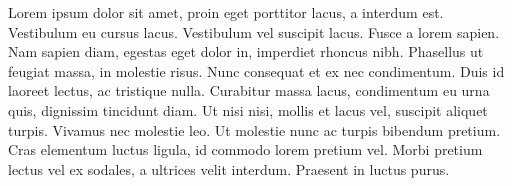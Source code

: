 \begin{page}
	
	
	\begin{Profile}[%
		image=img/ep.jpg,
	]%
		Lorem ipsum dolor sit amet, proin eget porttitor lacus, a interdum est. Vestibulum eu cursus lacus. Vestibulum vel suscipit lacus. Fusce a lorem sapien. Nam sapien diam, egestas eget dolor in, imperdiet rhoncus nibh. Phasellus ut feugiat massa, in molestie risus. Nunc consequat et ex nec condimentum. Duis id laoreet lectus, ac tristique nulla. Curabitur massa lacus, condimentum eu urna quis, dignissim tincidunt diam. Ut nisi nisi, mollis et lacus vel, suscipit aliquet turpis. Vivamus nec molestie leo. Ut molestie nunc ac turpis bibendum pretium. Cras elementum luctus ligula, id commodo lorem pretium vel. Morbi pretium lectus vel ex sodales, a ultrices velit interdum. Praesent in luctus purus.%
	\end{Profile}

\end{page}